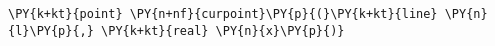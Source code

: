 \begin{Verbatim}[commandchars=\\\{\}]
    \PY{k+kt}{point} \PY{n+nf}{curpoint}\PY{p}{(}\PY{k+kt}{line} \PY{n}{l}\PY{p}{,} \PY{k+kt}{real} \PY{n}{x}\PY{p}{)}
\end{Verbatim}
